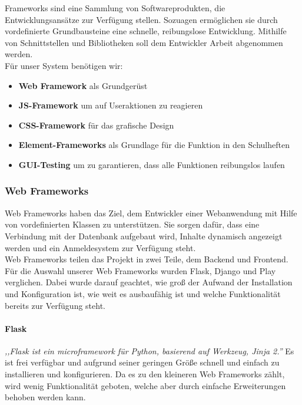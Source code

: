 
Frameworks sind eine Sammlung von Softwareprodukten, die Entwicklungsansätze zur Verfügung stellen. Sozuagen ermöglichen sie durch vordefinierte Grundbausteine eine schnelle, reibungslose Entwicklung. Mithilfe von Schnittstellen und Bibliotheken soll dem Entwickler Arbeit abgenommen werden.\\
Für unser System benötigen wir:
\begin{itemize}
\item \textbf{Web Framework} als Grundgerüst
\item \textbf{JS-Framework} um auf Useraktionen zu reagieren
\item \textbf{CSS-Framework} für das grafische Design
\item \textbf{Element-Frameworks} als Grundlage für die Funktion in den Schulheften
\item \textbf{GUI-Testing} um zu garantieren, dass alle Funktionen reibungslos laufen
\end{itemize}

\subsubsection{Web Frameworks}
Web Frameworks haben das Ziel, dem Entwickler einer Webanwendung mit Hilfe von vordefinierten Klassen zu unterstützen. Sie sorgen dafür, dass eine Verbindung mit der Datenbank aufgebaut wird, Inhalte dynamisch angezeigt werden und ein Anmeldesystem zur Verfügung steht.\\
Web Frameworks teilen das Projekt in zwei Teile, dem Backend und Frontend.\\
Für die Auswahl unserer Web Frameworks wurden Flask, Django und Play verglichen. Dabei wurde darauf geachtet, wie groß der Aufwand der Installation und Konfiguration ist, wie weit es ausbaufähig ist und welche Funktionalität bereits zur Verfügung steht.

\newpage

\paragraph{Flask}
\textit{,,Flask ist ein microframework für Python, basierend auf Werkzeug, Jinja 2.''}\cite{FLASK} Es ist frei verfügbar und aufgrund seiner geringen Größe schnell und einfach zu installieren und konfigurieren. Da es zu den kleineren Web Frameworks zählt, wird wenig Funktionalität geboten, welche aber durch einfache Erweiterungen behoben werden kann.\cite{FLASK}

